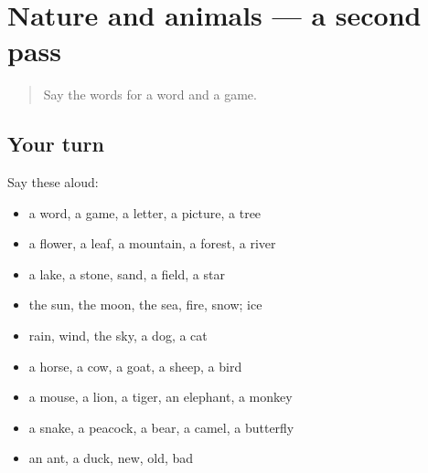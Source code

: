 \section[(dialogue)]{Nature and animals — a second pass}

\label{lesson:MR-R103-second-pass-nature-and-animals}



\begin{quote}
Say the words for a word and a game.
\end{quote}

\subsection*{Your turn}
Say these aloud:

\begin{itemize}
\raggedright
  \item a word, a game, a letter, a picture, a tree
  \item a flower, a leaf, a mountain, a forest, a river
  \item a lake, a stone, sand, a field, a star
  \item the sun, the moon, the sea, fire, snow; ice
  \item rain, wind, the sky, a dog, a cat
  \item a horse, a cow, a goat, a sheep, a bird
  \item a mouse, a lion, a tiger, an elephant, a monkey
  \item a snake, a peacock, a bear, a camel, a butterfly
  \item an ant, a duck, new, old, bad
\end{itemize}


